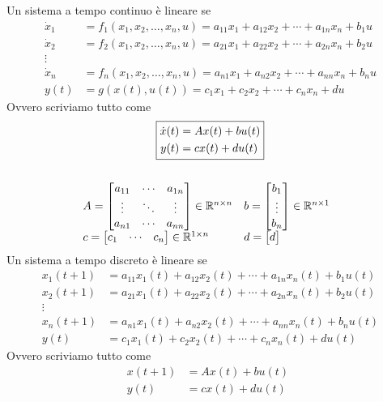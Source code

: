 Un sistema a tempo continuo è lineare se
\begin{align*}
	\dot{x}_1 & =f_1(x_1 ,x_2 ,\dotsc ,x_n ,u) =a_{11} x_1 +a_{12} x_2 +\cdots +a_{1n} x_n +b_1 u \\
	\dot{x}_2 & =f_2(x_1 ,x_2 ,\dotsc ,x_n ,u) =a_{21} x_1 +a_{22} x_2 +\cdots +a_{2n} x_n +b_2 u \\
	\vdots    &                                                                                    \\
	\dot{x}_n & =f_n(x_1 ,x_2 ,\dotsc ,x_n ,u) =a_{n1} x_1 +a_{n2} x_2 +\cdots +a_{nn} x_n +b_n u \\
	y(t)      & =g(x(t),u(t))=c_1 x_1 +c_2 x_2 +\cdots +c_n x_n +du                               
\end{align*}
Ovvero scriviamo tutto come
\begin{gather*}
	\boxed{
		\begin{aligned}
			\dot{x}(t) & =Ax(t) +bu(t) \\
			y(t)       & =cx(t) +du(t) 
		\end{aligned}
		}\\
	\\
	\begin{array}{ l l }
		A=\begin{bmatrix}
		a_{11} & \cdots & a_{1n} \\
		\vdots & \ddots & \vdots \\
		a_{n1} & \cdots & a_{nn} 
		\end{bmatrix} \in \mathbb{R}^{n\times n} & b=\begin{bmatrix}
		b_1\\
		\vdots \\
		b_n
		\end{bmatrix} \in \mathbb{R}^{n\times 1}\\
		c=\begin{bmatrix}
		c_1    & \cdots & c_n    
		\end{bmatrix} \in \mathbb{R}^{1\times n} & d=\begin{bmatrix}
		d
		\end{bmatrix}
	\end{array} \ \ 
\end{gather*}
Un sistema a tempo discreto è lineare se
\begin{align*}
	x_1(t+1) & =a_{11} x_1(t) +a_{12} x_2(t) +\cdots +a_{1n} x_n(t) +b_1 u(t) \\
	x_2(t+1) & =a_{21} x_1(t) +a_{22} x_2(t) +\cdots +a_{2n} x_n(t) +b_2 u(t) \\
	\vdots    &                                                                \\
	x_n(t+1) & =a_{n1} x_1(t) +a_{n2} x_2(t) +\cdots +a_{nn} x_n(t) +b_n u(t) \\
	y(t)      & =c_1 x_1(t) +c_2 x_2(t) +\cdots +c_n x_n(t) +du(t)             
\end{align*}
Ovvero scriviamo tutto come
\begin{equation*}
	\boxed{
		\begin{aligned}
			x(t+1) & =Ax(t) +bu(t) \\
			y(t)    & =cx(t) +du(t) 
		\end{aligned} \ \ }
\end{equation*}

